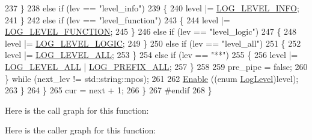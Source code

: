 \begin{DoxyCode}
237                     \}
238                   \textcolor{keywordflow}{else} \textcolor{keywordflow}{if} (lev == \textcolor{stringliteral}{"level\_info"})
239                     \{
240                       level |= \hyperlink{namespacens3_aa6464a4d69551a9cc968e17a65f39bdbae36aedc880de94fd5a5b53bb9fe65628}{LOG\_LEVEL\_INFO};
241                     \}
242                   \textcolor{keywordflow}{else} \textcolor{keywordflow}{if} (lev == \textcolor{stringliteral}{"level\_function"})
243                     \{
244                       level |= \hyperlink{namespacens3_aa6464a4d69551a9cc968e17a65f39bdba53ab278427c09a0c3bc2cd87b09681dc}{LOG\_LEVEL\_FUNCTION};
245                     \}
246                   \textcolor{keywordflow}{else} \textcolor{keywordflow}{if} (lev == \textcolor{stringliteral}{"level\_logic"})
247                     \{
248                       level |= \hyperlink{namespacens3_aa6464a4d69551a9cc968e17a65f39bdba11526a7d4f0e6b4e1bac5754781a4f2a}{LOG\_LEVEL\_LOGIC};
249                     \}
250                   \textcolor{keywordflow}{else} \textcolor{keywordflow}{if} (lev == \textcolor{stringliteral}{"level\_all"})
251                     \{
252                       level |= \hyperlink{namespacens3_aa6464a4d69551a9cc968e17a65f39bdba022b1237a4fd1b08d034471df3c58586}{LOG\_LEVEL\_ALL};
253                     \}
254                   \textcolor{keywordflow}{else} \textcolor{keywordflow}{if} (lev == \textcolor{stringliteral}{"**"})
255                     \{
256                       level |= \hyperlink{namespacens3_aa6464a4d69551a9cc968e17a65f39bdba022b1237a4fd1b08d034471df3c58586}{LOG\_LEVEL\_ALL} | \hyperlink{namespacens3_aa6464a4d69551a9cc968e17a65f39bdba4e8ff81bba6e1d801ef6b400cbf5c9cc}{LOG\_PREFIX\_ALL};
257                     \}
258 
259                   pre\_pipe = \textcolor{keyword}{false};
260                 \} \textcolor{keywordflow}{while} (next\_lev != std::string::npos);
261 
262               \hyperlink{classns3_1_1LogComponent_a3e0f18a35d2d3a0fb4825d369ec86bb7}{Enable} ((\textcolor{keyword}{enum} \hyperlink{namespacens3_aa6464a4d69551a9cc968e17a65f39bdb}{LogLevel})level);
263             \}
264         \}
265       cur = next + 1;
266     \}
267 \textcolor{preprocessor}{#endif}
268 \}
\end{DoxyCode}


Here is the call graph for this function\+:




Here is the caller graph for this function\+:


